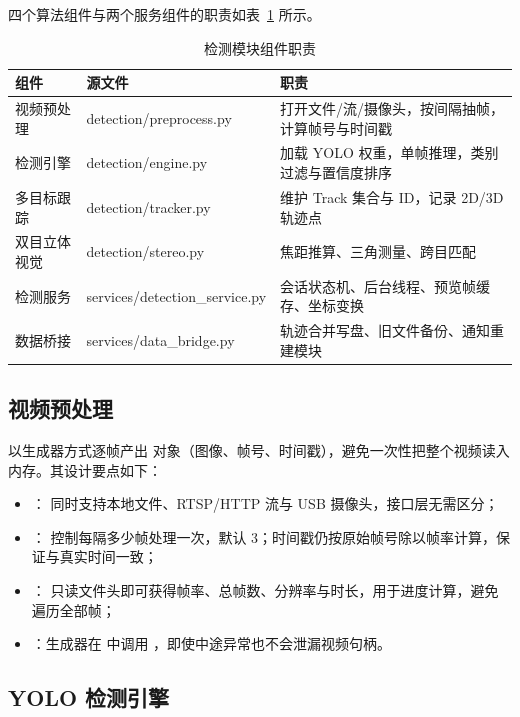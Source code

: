 四个算法组件与两个服务组件的职责如表~\ref{tab:detcomp} 所示。

\begin{table}[H]
\centering
\caption{检测模块组件职责}
\label{tab:detcomp}
\small
\begin{tabularx}{\linewidth}{@{}>{\heiti\scriptsize}p{2.6cm}>{\raggedright\ttfamily\scriptsize}p{4.4cm}>{\raggedright\arraybackslash}X@{}}
\toprule
组件 & 源文件 & 职责 \\
\midrule
视频预处理 & detection/preprocess.py & 打开文件/流/摄像头，按间隔抽帧，计算帧号与时间戳 \\
检测引擎 & detection/engine.py & 加载 YOLO 权重，单帧推理，类别过滤与置信度排序 \\
多目标跟踪 & detection/tracker.py & 维护 Track 集合与 ID，记录 2D/3D 轨迹点 \\
双目立体视觉 & detection/stereo.py & 焦距推算、三角测量、跨目匹配 \\
检测服务 & services/detection\_service.py & 会话状态机、后台线程、预览帧缓存、坐标变换 \\
数据桥接 & services/data\_bridge.py & 轨迹合并写盘、旧文件备份、通知重建模块 \\
\bottomrule
\end{tabularx}
\end{table}

\subsection{视频预处理}

 以生成器方式逐帧产出  对象（图像、帧号、时间戳），避免一次性把整个视频读入内存。其设计要点如下：

\begin{itemize}
  \item {}： 同时支持本地文件、RTSP/HTTP 流与 USB 摄像头，接口层无需区分；
  \item {}： 控制每隔多少帧处理一次，默认 3；时间戳仍按原始帧号除以帧率计算，保证与真实时间一致；
  \item {}： 只读文件头即可获得帧率、总帧数、分辨率与时长，用于进度计算，避免遍历全部帧；
  \item {}：生成器在  中调用 ，即使中途异常也不会泄漏视频句柄。
\end{itemize}

\subsection{YOLO 检测引擎}


